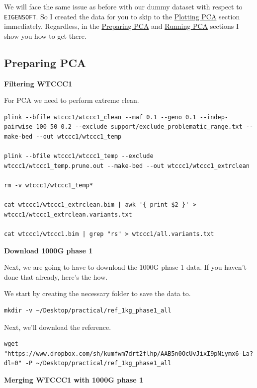 \documentclass[
]{book}
\newcommand{\passthrough}[1]{#1}
\begin{document}
We will face the same issue as before with our dummy dataset with respect to \passthrough{\lstinline!EIGENSOFT!}. So I created the data for you to skip to the \protect\hyperlink{plotting-pca}{Plotting PCA} section immediately. Regardless, in the \protect\hyperlink{preparing-pca}{Preparing PCA} and \protect\hyperlink{running-pca-1}{Running PCA} sections I show you how to get there.

\hypertarget{preparing-pca}{%
\subsection{Preparing PCA}\label{preparing-pca}}

\textbf{Filtering WTCCC1}

For PCA we need to perform extreme clean.

\begin{lstlisting}
plink --bfile wtccc1/wtccc1_clean --maf 0.1 --geno 0.1 --indep-pairwise 100 50 0.2 --exclude support/exclude_problematic_range.txt --make-bed --out wtccc1/wtccc1_temp

plink --bfile wtccc1/wtccc1_temp --exclude wtccc1/wtccc1_temp.prune.out --make-bed --out wtccc1/wtccc1_extrclean

rm -v wtccc1/wtccc1_temp*

cat wtccc1/wtccc1_extrclean.bim | awk '{ print $2 }' > wtccc1/wtccc1_extrclean.variants.txt

cat wtccc1/wtccc1.bim | grep "rs" > wtccc1/all.variants.txt
\end{lstlisting}

\textbf{Download 1000G phase 1}

Next, we are going to have to download the 1000G phase 1 data. If you haven't done that already, here's the how.

We start by creating the necessary folder to save the data to.

\begin{lstlisting}
mkdir -v ~/Desktop/practical/ref_1kg_phase1_all
\end{lstlisting}

Next, we'll download the reference.

\begin{lstlisting}
wget "https://www.dropbox.com/sh/kumfwm7drt2flhp/AAB5n0OcUvJixI9pNiymx6-La?dl=0" -P ~/Desktop/practical/ref_1kg_phase1_all
\end{lstlisting}

\textbf{Merging WTCCC1 with 1000G phase 1}
\end{document}
